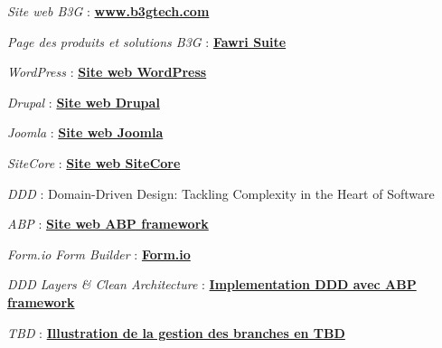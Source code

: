 \documentclass[12pt,a4paper,oneside]{book}
\begin{document}








%




\appendix



% 

\begin{thebibliography}{99}


    \emph{Site web B3G} :
    \href{https://b3gtech.com/}{\textbf{www.b3gtech.com}}

    \emph{Page des produits et solutions B3G} :
    \href{https://b3gtech.com/fawri-suite/}{\textbf{Fawri Suite}}


    \emph{WordPress} :
    \href{https://wordpress.com/fr/}{\textbf{Site web WordPress}}

    \emph{Drupal} :
    \href{https://www.drupal.org/}{\textbf{Site web Drupal}}

    \emph{Joomla} :
    \href{https://www.joomla.fr/}{\textbf{Site web Joomla}}

    \emph{SiteCore} :
    \href{https://www.sitecore.com/}{\textbf{Site web SiteCore}}

    \emph{DDD} :
    Domain-Driven Design: Tackling Complexity in the Heart of Software



    \emph{ABP} :
    \href{https://abp.io/}{\textbf{Site web ABP framework}}

    \emph{Form.io Form Builder} :
    \href{https://form.io/}{\textbf{Form.io}}

    \emph{DDD Layers \& Clean Architecture} :
    \href{https://docs.abp.io/en/abp/4.2/Domain-Driven-Design-Implementation-Guide}{\textbf{Implementation DDD avec ABP framework}}

    \emph{TBD} :
    \href{https://statusneo.com/trunk-based-development/}{\textbf{Illustration de la gestion des branches en TBD}}


\end{thebibliography}
\end{document}
